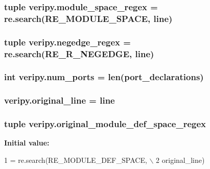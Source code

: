 \hypertarget{namespaceveripy_ae0aec319e1f286eaeeb8ec758137f7a9}{
\subsubsection[{module\-\_\-space\-\_\-regex}]{\setlength{\rightskip}{0pt plus 5cm}tuple veripy.\-module\-\_\-space\-\_\-regex = re.\-search(R\-E\-\_\-\-M\-O\-D\-U\-L\-E\-\_\-\-S\-P\-A\-C\-E, {\bf line})}}\label{namespaceveripy_ae0aec319e1f286eaeeb8ec758137f7a9}
\hypertarget{namespaceveripy_a73d80450abbdcabc03a0ff6e4fbd5d48}{
\subsubsection[{negedge\-\_\-regex}]{\setlength{\rightskip}{0pt plus 5cm}tuple veripy.\-negedge\-\_\-regex = re.\-search(R\-E\-\_\-\-R\-\_\-\-N\-E\-G\-E\-D\-G\-E, {\bf line})}}\label{namespaceveripy_a73d80450abbdcabc03a0ff6e4fbd5d48}
\hypertarget{namespaceveripy_a1a9f35e27689bee768d00ee633d9b263}{
\subsubsection[{num\-\_\-ports}]{\setlength{\rightskip}{0pt plus 5cm}int veripy.\-num\-\_\-ports = len({\bf port\-\_\-declarations})}}\label{namespaceveripy_a1a9f35e27689bee768d00ee633d9b263}
\hypertarget{namespaceveripy_ab15a6bb1f76d3b0db1c63066479489eb}{
\subsubsection[{original\-\_\-line}]{\setlength{\rightskip}{0pt plus 5cm}veripy.\-original\-\_\-line = {\bf line}}}\label{namespaceveripy_ab15a6bb1f76d3b0db1c63066479489eb}
\hypertarget{namespaceveripy_ac72c2df33623add620128261218cd038}{
\subsubsection[{original\-\_\-module\-\_\-def\-\_\-space\-\_\-regex}]{\setlength{\rightskip}{0pt plus 5cm}tuple veripy.\-original\-\_\-module\-\_\-def\-\_\-space\-\_\-regex}}\label{namespaceveripy_ac72c2df33623add620128261218cd038}
{\bfseries Initial value\-:}
\begin{DoxyCode}
1 = re.search(RE\_MODULE\_DEF\_SPACE, \(\backslash\)
2                 original\_line)
\end{DoxyCode}


